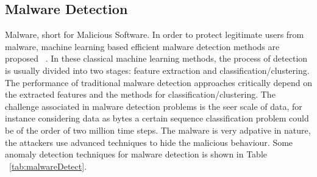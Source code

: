 \subsection{Malware Detection}

Malware, short for Malicious Software. In  order to protect legitimate users from malware, machine learning based efficient malware detection  methods are proposed ~\cite{ye2017survey}. In these classical machine learning methods, the process of detection is usually divided into two stages: feature extraction and classification/clustering. The performance of traditional malware detection approaches critically depend on the extracted features and the methods for classification/clustering. The challenge associated in malware detection problems is the seer scale of data, for instance considering data as bytes a certain  sequence classification problem could be  of the order of two million time steps. The  malware is very adpative in nature, the attackers use advanced techniques to hide the malicious behaviour. Some anomaly detection techniques for malware detection is shown in Table ~\ref{tab:malwareDetect}.

